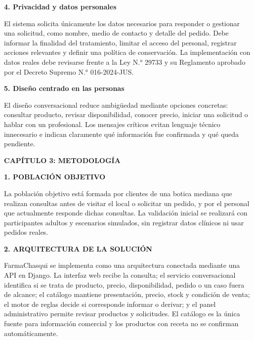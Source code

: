 \documentclass[11pt,a4paper]{article}
\newcommand{\capitulo}[1]{\vspace{1.2em}\noindent\textbf{\large #1}\par\vspace{0.45em}}
\newcommand{\apartado}[1]{\vspace{0.85em}\noindent\textbf{#1}\par\vspace{0.3em}}
\begin{document}
\apartado{4. Privacidad y datos personales}

El sistema solicita únicamente los datos necesarios para responder o gestionar una solicitud, como nombre, medio de contacto y detalle del pedido. Debe informar la finalidad del tratamiento, limitar el acceso del personal, registrar acciones relevantes y definir una política de conservación. La implementación con datos reales debe revisarse frente a la Ley N.° 29733 y su Reglamento aprobado por el Decreto Supremo N.° 016-2024-JUS.

\apartado{5. Diseño centrado en las personas}

El diseño conversacional reduce ambigüedad mediante opciones concretas: consultar producto, revisar disponibilidad, conocer precio, iniciar una solicitud o hablar con un profesional. Los mensajes críticos evitan lenguaje técnico innecesario e indican claramente qué información fue confirmada y qué queda pendiente.

\capitulo{CAPÍTULO 3: METODOLOGÍA}

\apartado{1. POBLACIÓN OBJETIVO}

La población objetivo está formada por clientes de una botica mediana que realizan consultas antes de visitar el local o solicitar un pedido, y por el personal que actualmente responde dichas consultas. La validación inicial se realizará con participantes adultos y escenarios simulados, sin registrar datos clínicos ni usar pedidos reales.

\apartado{2. ARQUITECTURA DE LA SOLUCIÓN}

FarmaChasqui se implementa como una arquitectura conectada mediante una API en Django. La interfaz web recibe la consulta; el servicio conversacional identifica si se trata de producto, precio, disponibilidad, pedido o un caso fuera de alcance; el catálogo mantiene presentación, precio, stock y condición de venta; el motor de reglas decide si corresponde informar o derivar; y el panel administrativo permite revisar productos y solicitudes. El catálogo es la única fuente para información comercial y los productos con receta no se confirman automáticamente.
\end{document}
